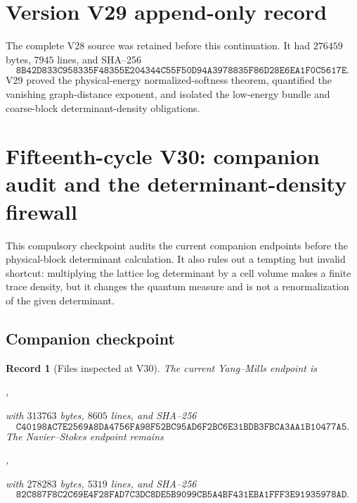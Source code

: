 \documentclass[11pt]{article}
\newtheorem{record}[theorem]{Record}
\theoremstyle{remark}
\begin{document}
\section*{Version V29 append-only record}
The complete V28 source was retained before this continuation.  It
had \(276459\) bytes, \(7945\) lines, and SHA--256
\[
 \texttt{8B42D833C958335F48355E204344C55F50D94A3978835F86D28E6EA1F0C5617E}.
\]
V29 proved the physical-energy normalized-softness theorem,
quantified the vanishing graph-distance exponent, and isolated the
low-energy bundle and coarse-block determinant-density obligations.
\section{Fifteenth-cycle V30: companion audit and the determinant-density firewall}
\label{sec:v15v30}

This compulsory checkpoint audits the current companion endpoints
before the physical-block determinant calculation.  It also rules
out a tempting but invalid shortcut: multiplying the lattice log
determinant by a cell volume makes a finite trace density, but it
changes the quantum measure and is not a renormalization of the
given determinant.

\subsection{Companion checkpoint}

\begin{record}[Files inspected at V30]
\label{rec:v15v30-companions}
The current Yang--Mills endpoint is
\begin{center}
,
\end{center}
with \(313763\) bytes, \(8605\) lines, and SHA--256
\[
 \texttt{C40198AC7E2569A8DA4756FA98F52BC95AD6F2BC6E31BDB3FBCA3AA1B10477A5}.
                                                               \tag{30.1}
\]
The Navier--Stokes endpoint remains
\begin{center}
,
\end{center}
with \(278283\) bytes, \(5319\) lines, and SHA--256
\[
 \texttt{82C887F8C2C69E4F28FAD7C3DC8DE5B9099CB5A4BF431EBA1FFF3E91935978AD}.
                                                               \tag{30.2}
\]
\end{record}
\end{document}
